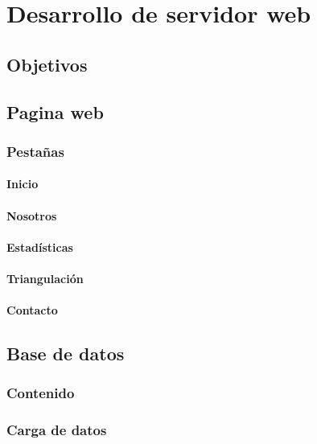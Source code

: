 \chapter{Desarrollo de servidor web}
\section{Objetivos}
\section{Pagina web}
\subsection{Pestañas}
\subsubsection{Inicio}
\subsubsection{Nosotros}
\subsubsection{Estadísticas}
\subsubsection{Triangulación}
\subsubsection{Contacto}
\section{Base de datos}
\subsection{Contenido}
\subsection{Carga de datos}